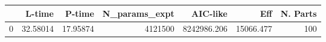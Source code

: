 \begin{tabular}{lrrrrrr}
\toprule
{} &    L-time &    P-time &  N\_params\_expt &     AIC-like &        Eff &  N. Parts \\
\midrule
0 &  32.58014 &  17.95874 &        4121500 &  8242986.206 &  15066.477 &       100 \\
\bottomrule
\end{tabular}
